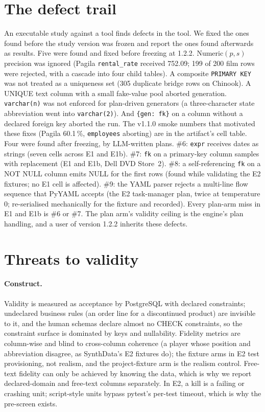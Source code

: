 \documentclass[preprint,12pt]{elsarticle}
\begin{document}
\section{The defect trail}
\label{sec:defects}
An executable study against a tool finds defects in the tool. We fixed the ones found before the study version was frozen and report the ones found afterwards as results. Five were found and fixed before freezing at 1.2.2. Numeric$(p,s)$ precision was ignored (Pagila \texttt{rental\_rate} received 752.09; 199 of 200 film rows were rejected, with a cascade into four child tables). A composite \texttt{PRIMARY KEY} was not treated as a uniqueness set (305 duplicate bridge rows on Chinook). A UNIQUE text column with a small fake-value pool aborted generation. \texttt{varchar(n)} was not enforced for plan-driven generators (a three-character state abbreviation went into \texttt{varchar(2)}). And \texttt{\{gen: fk\}} on a column without a declared foreign key aborted the run. The v1.1.0 smoke numbers that motivated these fixes (Pagila 60.1\,\%, \texttt{employees} aborting) are in the artifact's cell table. Four were found after freezing, by LLM-written plans. \#6: \texttt{expr} receives dates as strings (seven cells across E1 and E1b). \#7: \texttt{fk} on a primary-key column samples with replacement (E1 and E1b, Dell DVD Store~2). \#8: a self-referencing \texttt{fk} on a NOT NULL column emits NULL for the first rows (found while validating the E2 fixtures; no E1 cell is affected). \#9: the YAML parser rejects a multi-line flow sequence that PyYAML accepts (the E2 task-manager plan, twice at temperature 0; re-serialised mechanically for the fixture and recorded). Every plan-arm miss in E1 and E1b is \#6 or \#7. The plan arm's validity ceiling is the engine's plan handling, and a user of version 1.2.2 inherits these defects.

\section{Threats to validity}
\label{sec:threats}
\paragraph{Construct.} Validity is measured as acceptance by PostgreSQL with declared constraints; undeclared business rules (an order line for a discontinued product) are invisible to it, and the human schemas declare almost no CHECK constraints, so the constraint surface is dominated by keys and nullability. Fidelity metrics are column-wise and blind to cross-column coherence (a player whose position and abbreviation disagree, as SynthData's E2 fixtures do); the fixture arms in E2 test provisioning, not realism, and the project-fixture arm is the realism control. Free-text fidelity can only be achieved by knowing the data, which is why we report declared-domain and free-text columns separately. In E2, a kill is a failing or crashing unit; script-style units bypass pytest's per-test timeout, which is why the pre-screen exists.
\end{document}
